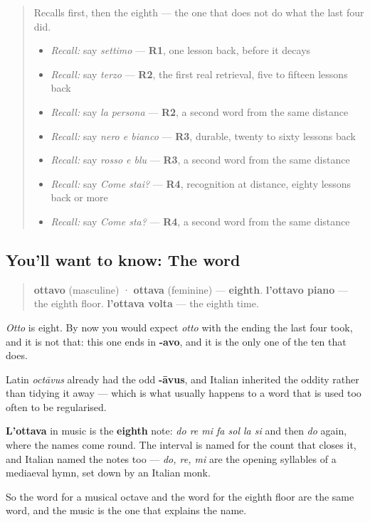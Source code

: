 \begin{quote}
Recalls first, then the eighth — the one that does not do what the last four did.

\begin{itemize}
\raggedright
  \item \emph{Recall:} say \emph{settimo} — \textbf{R1}, one lesson back, before it decays
  \item \emph{Recall:} say \emph{terzo} — \textbf{R2}, the first real retrieval, five to fifteen lessons back
  \item \emph{Recall:} say \emph{la persona} — \textbf{R2}, a second word from the same distance
  \item \emph{Recall:} say \emph{nero e bianco} — \textbf{R3}, durable, twenty to sixty lessons back
  \item \emph{Recall:} say \emph{rosso e blu} — \textbf{R3}, a second word from the same distance
  \item \emph{Recall:} say \emph{Come stai?} — \textbf{R4}, recognition at distance, eighty lessons back or more
  \item \emph{Recall:} say \emph{Come sta?} — \textbf{R4}, a second word from the same distance
\end{itemize}
\end{quote}

\subsection*{You'll want to know: The word}
\begin{quote}
\textbf{ottavo} (masculine) · \textbf{ottava} (feminine) — \textbf{eighth}. \textbf{l'ottavo piano} — the eighth floor. \textbf{l'ottava volta} — the eighth time.
\end{quote}

\emph{Otto} is eight. By now you would expect \emph{otto} with the ending the last four took, and it is not that: this one ends in \textbf{-avo}, and it is the only one of the ten that does.

\begin{cousinweb}
Latin \emph{octāvus} already had the odd \textbf{-āvus}, and Italian inherited the oddity rather than tidying it away — which is what usually happens to a word that is used too often to be regularised.

\textbf{L'ottava} in music is the \textbf{eighth} note: \emph{do re mi fa sol la si} and then \emph{do} again, where the names come round. The interval is named for the count that closes it, and Italian named the notes too — \emph{do, re, mi} are the opening syllables of a mediaeval hymn, set down by an Italian monk.

So the word for a musical octave and the word for the eighth floor are the same word, and the music is the one that explains the name.
\end{cousinweb}

